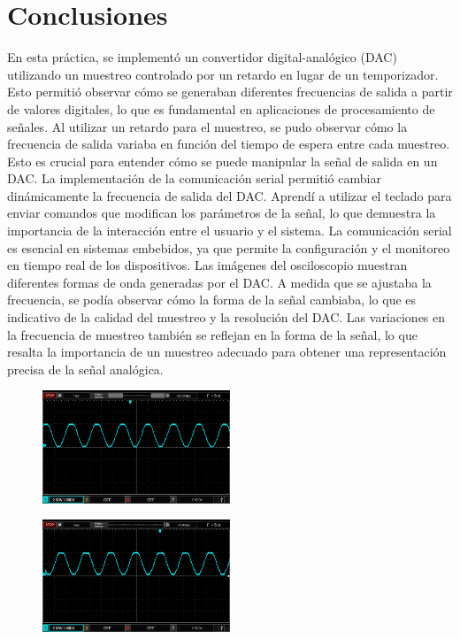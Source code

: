 \section{Conclusiones} 

En esta práctica, se implementó un convertidor digital-analógico (DAC) utilizando un muestreo controlado por un retardo en lugar de un temporizador. Esto permitió observar cómo se generaban diferentes frecuencias de salida a partir de valores digitales, lo que es fundamental en aplicaciones de procesamiento de señales. Al utilizar un retardo para el muestreo, se pudo observar cómo la frecuencia de salida variaba en función del tiempo de espera entre cada muestreo. Esto es crucial para entender cómo se puede manipular la señal de salida en un DAC. La implementación de la comunicación serial permitió cambiar dinámicamente la frecuencia de salida del DAC. Aprendí a utilizar el teclado para enviar comandos que modifican los parámetros de la señal, lo que demuestra la importancia de la interacción entre el usuario y el sistema. La comunicación serial es esencial en sistemas embebidos, ya que permite la configuración y el monitoreo en tiempo real de los dispositivos. Las imágenes del osciloscopio muestran diferentes formas de onda generadas por el DAC. A medida que se ajustaba la frecuencia, se podía observar cómo la forma de la señal cambiaba, lo que es indicativo de la calidad del muestreo y la resolución del DAC. Las variaciones en la frecuencia de muestreo también se reflejan en la forma de la señal, lo que resalta la importancia de un muestreo adecuado para obtener una representación precisa de la señal analógica. 

\begin{figure}[H]
      \centering
      \includegraphics[width=0.5\textwidth]{images/500HZ}
\end{figure}

\begin{figure}[H]
      \centering
      \includegraphics[width=0.5\textwidth]{images/250HZ}
\end{figure}

